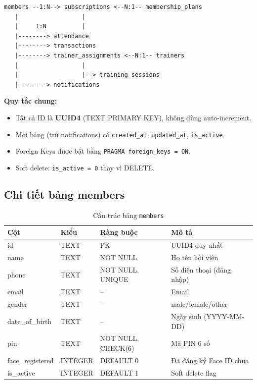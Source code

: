 \documentclass[12pt,a4paper]{article}
\begin{document}
\begin{verbatim}
members --1:N--> subscriptions <--N:1-- membership_plans
   |                  |
   |     1:N          |
   |--------> attendance
   |--------> transactions
   |--------> trainer_assignments <--N:1-- trainers
   |                  |
   |                  |--> training_sessions
   |--------> notifications
\end{verbatim}

\textbf{Quy tắc chung:}
\begin{itemize}[leftmargin=2cm]
	\item Tất cả ID là \textbf{UUID4} (TEXT PRIMARY KEY), không dùng auto-increment.
	\item Mọi bảng (trừ notifications) có \texttt{created\_at}, \texttt{updated\_at}, \texttt{is\_active}.
	\item Foreign Keys được bật bằng \texttt{PRAGMA foreign\_keys = ON}.
	\item Soft delete: \texttt{is\_active = 0} thay vì DELETE.
\end{itemize}

\subsection{Chi tiết bảng members}

\begin{table}[H]
	\centering
	\caption{Cấu trúc bảng \texttt{members}}
	\begin{tabularx}{\textwidth}{|l|l|l|X|}
		\hline
		\textbf{Cột}     & \textbf{Kiểu} & \textbf{Ràng buộc} & \textbf{Mô tả}            \\
		\hline
		id               & TEXT          & PK                 & UUID4 duy nhất            \\
		\hline
		name             & TEXT          & NOT NULL           & Họ tên hội viên           \\
		\hline
		phone            & TEXT          & NOT NULL, UNIQUE   & Số điện thoại (đăng nhập) \\
		\hline
		email            & TEXT          & --                 & Email                     \\
		\hline
		gender           & TEXT          & --                 & male/female/other         \\
		\hline
		date\_of\_birth  & TEXT          & --                 & Ngày sinh (YYYY-MM-DD)    \\
		\hline
		pin              & TEXT          & NOT NULL, CHECK(6) & Mã PIN 6 số               \\
		\hline
		face\_registered & INTEGER       & DEFAULT 0          & Đã đăng ký Face ID chưa   \\
		\hline
		is\_active       & INTEGER       & DEFAULT 1          & Soft delete flag          \\
		\hline
	\end{tabularx}
\end{table}
\end{document}
